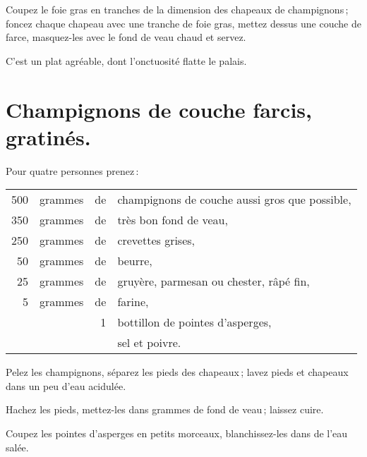 Coupez le foie gras en tranches de la dimension des chapeaux de champignons ;
foncez chaque chapeau avec une tranche de foie gras, mettez dessus une couche
de farce, masquez-les avec le fond de veau chaud et servez.

C'est un plat agréable, dont l'onctuosité flatte le palais.

\section*{\centering Champignons de couche farcis, gratinés.}
{}

Pour quatre personnes prenez :

\footnotesize
\begin{longtable}{rrrp{16em}}
    500 & grammes & de & champignons de couche aussi gros que possible,                                   \\
    350 & grammes & de & très bon fond de veau,                                                           \\
    250 & grammes & de & crevettes grises,                                                                \\
     50 & grammes & de & beurre,                                                                          \\
     25 & grammes & de & gruyère, parmesan ou chester, râpé fin,                                          \\
      5 & grammes & de & farine,                                                                          \\
        &         &  1 & bottillon de pointes d’asperges,                                                 \\
        &         &    & sel et poivre.                                                                   \\
\end{longtable}
\normalsize

Pelez les champignons, séparez les pieds des chapeaux ; lavez pieds et chapeaux
dans un peu d'eau acidulée.

Hachez les pieds, mettez-les dans {\mmm} grammes de fond de veau ;
laissez cuire.

Coupez les pointes d’asperges en petits morceaux, blanchissez-les dans de l'eau
salée.

